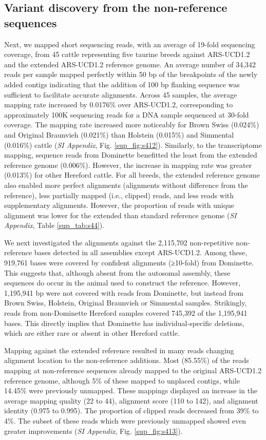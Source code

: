 \documentclass[../main.tex]{subfiles}
\begin{document}
\subsection*{Variant discovery from the non-reference sequences}

Next, we mapped short sequencing reads, with an average of 19-fold sequencing coverage, from 45 cattle representing five taurine breeds against ARS-UCD1.2 and the extended ARS-UCD1.2 reference genome. An average number of 34,342 reads per sample mapped perfectly within 50 bp of the breakpoints of the newly added contigs indicating that the addition of 100 bp flanking sequence was sufficient to facilitate accurate alignments. Across 45 samples, the average mapping rate increased by 0.0176\% over ARS-UCD1.2, corresponding to approximately 100K sequencing reads for a DNA sample sequenced at 30-fold coverage. The mapping rate increased more noticeably for Brown Swiss (0.024\%) and Original Braunvieh (0.021\%) than Holstein (0.015\%) and Simmental (0.016\%) cattle (\emph{SI Appendix}, Fig. \ref{sup_fig:s412}). Similarly, to the transcriptome mapping, sequence reads from Dominette benefitted the least from the extended reference genome (0.006\%). However, the increase in mapping rate was greater (0.013\%) for other Hereford cattle. For all breeds, the extended reference genome also enabled more perfect alignments (alignments without difference from the reference), less partially mapped (i.e., clipped) reads, and less reads with supplementary alignments. However, the proportion of reads with unique alignment was lower for the extended than standard reference genome (\emph{SI Appendix}, Table \ref{sup_tab:s44}). 

We next investigated the alignments against the 2,115,702 non-repetitive non-reference bases detected in all assemblies except ARS-UCD1.2. Among these, 919,761 bases were covered by confident alignments (≥10-fold) from Dominette. This suggests that, although absent from the autosomal assembly, these sequences do occur in the animal used to construct the reference. However, 1,195,941 bp were not covered with reads from Dominette, but instead from Brown Swiss, Holstein, Original Braunvieh or Simmental samples. Strikingly, reads from non-Dominette Hereford samples covered 745,392 of the 1,195,941 bases. This directly implies that Dominette has individual-specific deletions, which are either rare or absent in other Hereford cattle.

Mapping against the extended reference resulted in many reads changing alignment location to the non-reference additions. Most (85.55\%) of the reads mapping at non-reference sequences already mapped to the original ARS-UCD1.2 reference genome, although 5\% of these mapped to unplaced contigs, while 14.45\% were previously unmapped. These mappings displayed an increase in the average mapping quality (22 to 44), alignment score (110 to 142), and alignment identity (0.975 to 0.995). The proportion of clipped reads decreased from 39\% to 4\%. The subset of these reads which were previously unmapped showed even greater improvements (\emph{SI Appendix}, Fig. \ref{sup_fig:s413}).
\end{document}
